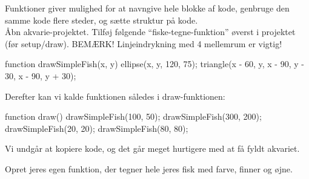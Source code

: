 \documentclass{ucph-handout}
\newcounter{handout}
\newcommand{\Ark}{Ark \#\arabic{handout} -- }
\begin{document}
\newpage
{}

\renewcommand{\Title}{\Ark Funktioner}%

\begin{exercisebox}[adjusted title=Fiske-funktion]
Funktioner giver mulighed for at navngive hele blokke af kode,
genbruge den samme kode flere steder,
og sætte struktur på kode.\\

\noindent
Åbn akvarie-projektet. Tilføj følgende ``fiske-tegne-funktion''
øverst i projektet (før setup/draw). BEMÆRK! Linjeindrykning med 4 mellemrum er vigtig!

\begin{javascript}
function drawSimpleFish(x, y) {
    ellipse(x, y, 120, 75);
    triangle(x - 60, y, x - 90, y - 30, x - 90, y + 30);
}
\end{javascript}

\noindent
Derefter kan vi kalde funktionen således i draw-funktionen:
\begin{javascript}
function draw() {
	drawSimpleFish(100,  50);
	drawSimpleFish(300, 200);
	drawSimpleFish(20, 20);
	drawSimpleFish(80, 80);
}
\end{javascript}
Vi undgår at kopiere kode, og det går meget hurtigere med at få fyldt
akvariet.

Opret jeres egen  funktion, der tegner hele jeres
fisk med farve, finner og øjne.
\end{exercisebox}
\end{document}
